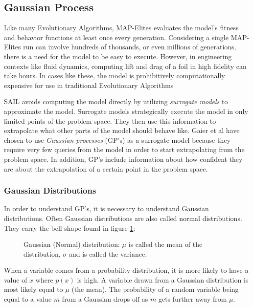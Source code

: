 \documentclass{sig-alternate}
\begin{document}
\label{MAPElitesSub}

\subsection{Gaussian Process}
\label{gaussianProcess}

Like many Evolutionary Algorithms, MAP-Elites evaluates the model's fitness and behavior functions at least once every generation.
Considering a single MAP-Elites run can involve hundreds of thousands, or even millions of generations, there is a need for the model to be easy to execute.
However, in engineering contexts like fluid dynamics, computing lift and drag of a foil in high fidelity can take hours.
In cases like these, the model is prohibitively computationally expensive for use in traditional Evolutionary Algorithms

SAIL avoids computing the model directly by utilizing \textit{surrogate models} to approximate the model.
Surrogate models strategically execute the model in only limited points of the problem space. 
They then use this information to extrapolate what other parts of the model should behave like.
Gaier et al have chosen to use \textit{Gaussian processes} (GP's) as a surrogate model because they require very few queries from the model in order to start extrapolating from the problem space.
In addition, GP's include information about how confident they are about the extrapolation of a certain point in the problem space.

\subsubsection{Gaussian Distributions}
\label{GaussianDistributions}

In order to understand GP's, it is necessary to understand Gaussian distributions.
Often Gaussian distributions are also called normal distributions.
They carry the bell shape found in figure \ref{fig:UnivariateGaussian}:

\begin{figure}[htb]
\centering
{}
\caption{Gaussian (Normal) distribution: $\mu$ is called the mean of the distribution, $\sigma$ and is called the variance.}
\label{fig:UnivariateGaussian}
\end{figure}

When a variable comes from a probability distribution, it is more likely to have a value of $x$ where $p(x)$ is high.
A variable drawn from a Gaussian distribution is most likely equal to $\mu$ (the mean).
The probability of a random variable being equal to a value $m$ from a Gaussian drops off as $m$ gets further away from $\mu$.
\end{document}
